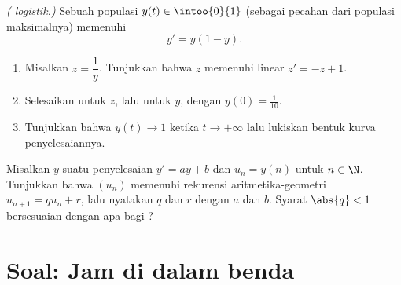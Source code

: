 \begin{exercise}[$\star\star\star$]\label{exo:g12:diffeq:8}
\emph{( logistik.)} Sebuah populasi $y(t) \in \intoo{0}{1}$ (sebagai
pecahan dari populasi maksimalnya) memenuhi
\[
y' = y(1 - y).
\]
\begin{enumerate}
  \item Misalkan $z = \dfrac{1}{y}$. Tunjukkan bahwa $z$ memenuhi 
        linear $z' = -z + 1$.
  \item Selesaikan untuk $z$, lalu untuk $y$, dengan $y(0) = \frac{1}{10}$.
  \item Tunjukkan bahwa $y(t) \to 1$ ketika $t \to +\infty$ lalu lukiskan bentuk
        kurva penyelesaiannya.
\end{enumerate}
\end{exercise}

\begin{exercise}[$\star\star\star$]\label{exo:g12:diffeq:9}
Misalkan $y$ suatu penyelesaian $y' = ay + b$ dan $u_n = y(n)$ untuk $n \in \N$.
Tunjukkan bahwa $(u_n)$ memenuhi rekurensi aritmetika-geometri
$u_{n+1} = q u_n + r$, lalu nyatakan $q$ dan $r$ dengan $a$ dan $b$. Syarat
$\abs{q} < 1$ bersesuaian dengan apa bagi ?
\end{exercise}

\section{Soal: Jam di dalam benda}

